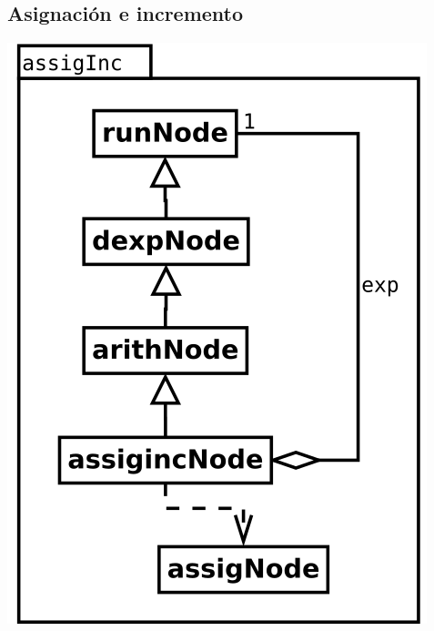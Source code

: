 \subsection {Asignación e incremento}
\begin{center}
\includegraphics[scale=0.4]{assigInc.png} \\
\end{center}

